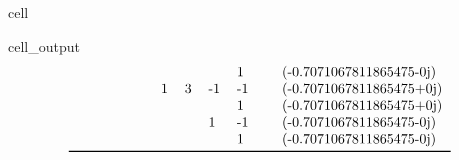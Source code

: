 \documentclass[letterpaper,table,10pt,english]{jupyterBook}
\begin{document}
\begin{sphinxuseclass}{cell}
\begin{sphinxVerbatimOutput}
\begin{sphinxuseclass}{cell_output}
\begin{equation*}
\begin{split}
\begin{tabular}{lllllllllll}
  &     &     &   &   &   &   &    &  1 &         &  (-0.7071067811865475-0j) \\
  &     &     &   &   & 1 & 3 & -1 & -1 &         &  (-0.7071067811865475+0j) \\
  &     &     &   &   &   &   &    &  1 &         &  (-0.7071067811865475+0j) \\
  &     &     &   &   &   &   &  1 & -1 &         &  (-0.7071067811865475-0j) \\
  &     &     &   &   &   &   &    &  1 &         &  (-0.7071067811865475-0j) \\
\bottomrule
\end{tabular}\end{split}
\end{equation*}
\end{sphinxuseclass}\end{sphinxVerbatimOutput}

\end{sphinxuseclass}
\end{document}

